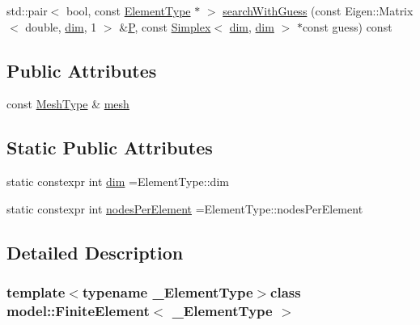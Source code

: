 \begin{DoxyCompactItemize}
std\+::pair$<$ bool, const \hyperlink{classmodel_1_1_finite_element_ac75db3a0b957c14015dfa8f17ce5b4ac}{Element\+Type} $\ast$ $>$ \hyperlink{classmodel_1_1_finite_element_a21859584897f54d6b3ada32f8b0b671f}{search\+With\+Guess} (const Eigen\+::\+Matrix$<$ double, \hyperlink{classmodel_1_1_finite_element_a818c65bf8f508c121f1990d430c2b0c0}{dim}, 1 $>$ \&\hyperlink{_f_e_m_2linear__elasticity__3d_2tetgen_2generate_p_o_l_ycube_8m_a50a9afb44201a65ab7ad5feb2150aeb6}{P}, const \hyperlink{classmodel_1_1_simplex}{Simplex}$<$ \hyperlink{classmodel_1_1_finite_element_a818c65bf8f508c121f1990d430c2b0c0}{dim}, \hyperlink{classmodel_1_1_finite_element_a818c65bf8f508c121f1990d430c2b0c0}{dim} $>$ $\ast$const guess) const 
\end{DoxyCompactItemize}
\subsection*{Public Attributes}
\begin{DoxyCompactItemize}
\item 
const \hyperlink{classmodel_1_1_finite_element_a4651eeb68711db1117585b38b3161042}{Mesh\+Type} \& \hyperlink{classmodel_1_1_finite_element_af628b0a6e34a2ce0d667c32519ca71c4}{mesh}
\end{DoxyCompactItemize}
\subsection*{Static Public Attributes}
\begin{DoxyCompactItemize}
\item 
static constexpr int \hyperlink{classmodel_1_1_finite_element_a818c65bf8f508c121f1990d430c2b0c0}{dim} =Element\+Type\+::dim
\item 
static constexpr int \hyperlink{classmodel_1_1_finite_element_a3a69660c59f2bb88f63e0cfc6a5a51df}{nodes\+Per\+Element} =Element\+Type\+::nodes\+Per\+Element
\end{DoxyCompactItemize}


\subsection{Detailed Description}
\subsubsection*{template$<$typename \+\_\+\+Element\+Type$>$class model\+::\+Finite\+Element$<$ \+\_\+\+Element\+Type $>$}



